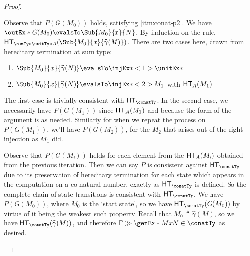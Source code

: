 \documentclass[letterpaper]{article}
\newcommand{\gmhat}[1]{\ensuremath{\widehat{\gamma}(#1)}}
\begin{document}
\begin{proof}
\begin{enumerate}
            Observe that $P(G(M_0))$ holds, satisfying \ref{itm:conat-p2}.
            We have $\outEx*{G(M_0)} \evalsTo \Sub{M_0}{x}{N}$.
            By induction on the rule, $\HT[\sumTy*{\unitTy*}{A}](\Sub{M_0}{x}{\gmhat{M}})$.
            There are two cases here, drawn from hereditary termination at sum type:

            \begin{enumerate}
                \item $\Sub{M_0}{x}{\gmhat{N}} \evalsTo \injEx*<1>{\unitEx*}$
                \item $\Sub{M_0}{x}{\gmhat{N}} \evalsTo \injEx*<2>{M_1}$ with $\HT[A](M_1)$
            \end{enumerate}

            The first case is trivially consistent with $\HT[\conatTy]$.
            In the second case, we necessarily have $P(G(M_1))$ since
            $\HT[A](M_1)$ and because the form of the argument is as needed.
            Similarly for when we repeat the process on $P(G(M_1))$, we'll have
            $P(G(M_2))$, for the $M_2$ that arises out of the right injection
            as $M_1$ did.

            Observe that $P(G(M_i))$ holds for each element from the
            $\HT[A](M_i)$ obtained from the previous iteration.
            Then we can say $P$ is consistent against $\HT[\conatTy]$ due to
            its preservation of hereditary termination for each state which
            appears in the computation on a co-natural number, exactly as
            $\HT[\conatTy]$ is defined.
            So the complete chain of state transitions is consistent with
            $\HT[\conatTy]$.
            We have $P(G(M_0))$, where $M_0$ is the `start state', so we have
            $\HT[\conatTy](G(M_0))$ by virtue of it being the weakest such
            property.
            Recall that $M_0 \triangleq \gmhat{M}$, so we have
            $\HT[\conatTy](\gmhat{M})$, and therefore $\Gamma \gg
            \genEx*{M}{x}{N} \in \conatTy$ as desired.


    \end{enumerate}
\end{proof}
\end{document}
